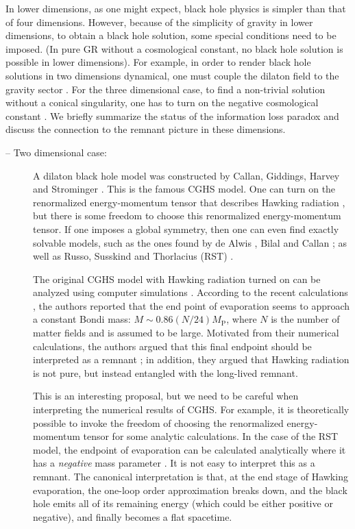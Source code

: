 \documentclass[12pt]{article}
\newcommand{\2}{$^2$}
\newcommand{\3}{$^3$}
\newcommand{\4}{$_4$}
\newcommand{\5}{$_5$}
\begin{document}
In lower dimensions, as one might expect, black hole physics is simpler than that of four dimensions. However, because of the simplicity of gravity in lower dimensions, to obtain a black hole solution, some special conditions need to be imposed. (In pure GR without a cosmological constant, no black hole solution is possible in lower dimensions). For example, in order to render black hole solutions in two dimensions dynamical, one must couple the dilaton field to the gravity sector \cite{Callan:1992rs}. For the three dimensional case, to find a non-trivial solution without a conical singularity, one has to turn on the negative cosmological constant \cite{Banados:1992wn}. We briefly summarize the status of the information loss paradox and discuss the connection to the remnant picture in these dimensions.
\begin{description}
\item[-- Two dimensional case:] A dilaton black hole model was constructed by Callan, Giddings, Harvey and Strominger \cite{Callan:1992rs}. This is the famous CGHS model. One can turn on the renormalized energy-momentum tensor that describes Hawking radiation \cite{Davies:1976ei}, but there is some freedom to choose this renormalized energy-momentum tensor. If one imposes a global symmetry, then one can even find exactly solvable models, such as the ones found by de Alwis \cite{deAlwis:1992hv}, Bilal and Callan \cite{Bilal:1992kv}; as well as Russo, Susskind and Thorlacius (RST) \cite{Russo:1992ax}.

The original CGHS model with Hawking radiation turned on can be analyzed using computer simulations \cite{Piran:1993tq}. According to the recent calculations \cite{Ashtekar:2010qz}, the authors reported that the end point of evaporation seems to approach a constant Bondi mass: $M \sim 0.86 (N/24) M_{\mathrm{P}}$, where $N$ is the number of matter fields and is assumed to be large. Motivated from their numerical calculations, the authors argued that this final endpoint should be interpreted as a remnant \cite{Almheiri:2013wka}; in addition, they argued that Hawking radiation is not pure, but instead entangled with the long-lived remnant.

This is an interesting proposal, but we need to be careful when interpreting the numerical results of CGHS. For example, it is theoretically possible to invoke the freedom of choosing the renormalized energy-momentum tensor for some analytic calculations. In the case of the RST model, the endpoint of evaporation can be calculated analytically where it has a \emph{negative} mass parameter \cite{Russo:1992ax}. It is not easy to interpret this as a remnant. The canonical interpretation is that, at the end stage of Hawking evaporation, the one-loop order approximation breaks down, and the black hole emits all of its remaining energy (which could be either positive or negative), and finally becomes a flat spacetime.


\end{description}
\end{document}
